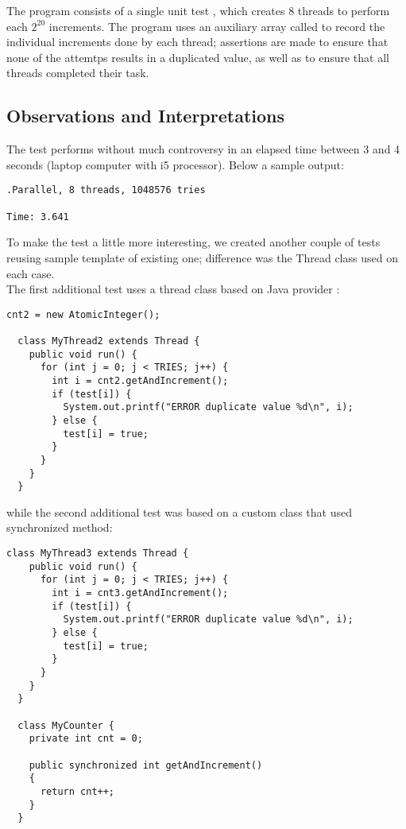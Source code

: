 The program consists of a single unit test ,
which creates 8 threads to perform each $2^20$ increments. The program
uses an auxiliary array called  to record the individual
increments done by each thread; assertions are made to ensure that
none of the attemtps results in a duplicated value, as well as to
ensure that all threads completed their task.

\subsection{Observations and Interpretations}

The test performs without much controversy in an elapsed time between
3 and 4 seconds (laptop computer with i5 processor). Below a sample
output: \\

\begin{verbatim}
.Parallel, 8 threads, 1048576 tries

Time: 3.641
\end{verbatim}
\hfill

To make the test a little more interesting, we created another couple
of tests reusing sample template of existing one; difference was the
Thread class used on each case. \\

The first additional test uses a thread class based on Java provider
: \\

\begin{lstlisting}[style=nonumbers]
  cnt2 = new AtomicInteger();

  class MyThread2 extends Thread {
    public void run() {
      for (int j = 0; j < TRIES; j++) {
        int i = cnt2.getAndIncrement();
        if (test[i]) {
          System.out.printf("ERROR duplicate value %d\n", i);
        } else {
          test[i] = true;
        }
      }
    }        
  }
\end{lstlisting}
\hfill

while the second additional test was based on a custom class that used
synchronized  method:\\

\begin{lstlisting}[style=nonumbers]
  class MyThread3 extends Thread {
    public void run() {
      for (int j = 0; j < TRIES; j++) {
        int i = cnt3.getAndIncrement();
        if (test[i]) {
          System.out.printf("ERROR duplicate value %d\n", i);
        } else {
          test[i] = true;
        }
      }
    }        
  }

  class MyCounter {
    private int cnt = 0;

    public synchronized int getAndIncrement()
    {
      return cnt++;
    }
  }
\end{lstlisting}
\hfill

